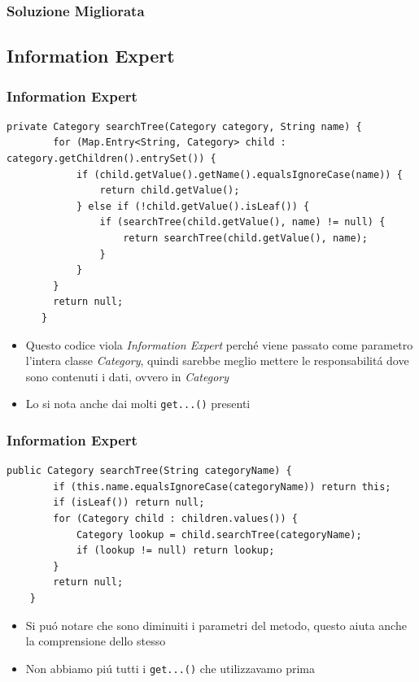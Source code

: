 \begin{frame}
    \frametitle{Soluzione Migliorata}

\end{frame}



\subsection{Information Expert}
    \begin{frame} [fragile]
      \frametitle{Information Expert}
        \begin{lstlisting}[autogobble, title={\texttt{CategoryController.java}}]
            private Category searchTree(Category category, String name) {
        for (Map.Entry<String, Category> child : category.getChildren().entrySet()) {
            if (child.getValue().getName().equalsIgnoreCase(name)) {
                return child.getValue();
            } else if (!child.getValue().isLeaf()) {
                if (searchTree(child.getValue(), name) != null) {
                    return searchTree(child.getValue(), name);
                }
            }
        }
        return null;
      }
        \end{lstlisting}
      \begin{itemize}
          \item Questo codice viola \emph{Information Expert} perché
          viene passato come parametro l'intera classe \emph{Category}, quindi sarebbe meglio
          mettere le responsabilitá dove sono contenuti i dati, ovvero in \emph{Category}
          \item Lo si nota anche dai molti \texttt{get...()} presenti
      \end{itemize}
    \end{frame}

\begin{frame} [fragile]
    \frametitle{Information Expert}
    \begin{lstlisting}[autogobble, title={\texttt{Category.java}}]
        public Category searchTree(String categoryName) {
        if (this.name.equalsIgnoreCase(categoryName)) return this;
        if (isLeaf()) return null;
        for (Category child : children.values()) {
            Category lookup = child.searchTree(categoryName);
            if (lookup != null) return lookup;
        }
        return null;
    }
    \end{lstlisting}
    \begin{itemize}
        \item Si puó notare che sono diminuiti i parametri del metodo, questo aiuta anche la comprensione dello stesso
        \item Non abbiamo piú tutti i \texttt{get...()} che utilizzavamo prima
    \end{itemize}
\end{frame}
